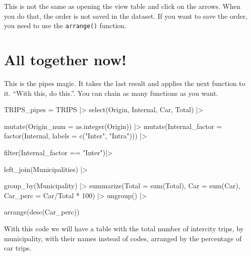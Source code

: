 \documentclass[
  letterpaper,
  DIV=11,
  numbers=noendperiod]{scrreprt}
\newenvironment{Shaded}{\begin{snugshade}}{\end{snugshade}}
\newcommand{\AttributeTok}[1]{\textcolor[rgb]{0.40,0.45,0.13}{#1}}
\newcommand{\DecValTok}[1]{\textcolor[rgb]{0.68,0.00,0.00}{#1}}
\newcommand{\FunctionTok}[1]{\textcolor[rgb]{0.28,0.35,0.67}{#1}}
\newcommand{\NormalTok}[1]{\textcolor[rgb]{0.00,0.23,0.31}{#1}}
\newcommand{\OtherTok}[1]{\textcolor[rgb]{0.00,0.23,0.31}{#1}}
\newcommand{\SpecialCharTok}[1]{\textcolor[rgb]{0.37,0.37,0.37}{#1}}
\newcommand{\StringTok}[1]{\textcolor[rgb]{0.13,0.47,0.30}{#1}}
\begin{document}
This is not the same as opening the view table and click on the arrows.
When you do that, the order is not saved in the dataset. If you want to
save the order, you need to use the \texttt{arrange()} function.

\section{All together now!}\label{all-together-now}

This is the pipes magic. It takes the last result and applies the next
function to it. ``With this, do this.''. You can chain as many functions
as you want.

\begin{Shaded}
\begin{Highlighting}[]
\NormalTok{TRIPS\_pipes }\OtherTok{=}\NormalTok{ TRIPS }\SpecialCharTok{|\textgreater{}} 
  \FunctionTok{select}\NormalTok{(Origin, Internal, Car, Total) }\SpecialCharTok{|\textgreater{}} 
  
  \FunctionTok{mutate}\NormalTok{(}\AttributeTok{Origin\_num =} \FunctionTok{as.integer}\NormalTok{(Origin)) }\SpecialCharTok{|\textgreater{}} 
  \FunctionTok{mutate}\NormalTok{(}\AttributeTok{Internal\_factor =} \FunctionTok{factor}\NormalTok{(Internal, }\AttributeTok{labels =} \FunctionTok{c}\NormalTok{(}\StringTok{"Inter"}\NormalTok{, }\StringTok{"Intra"}\NormalTok{))) }\SpecialCharTok{|\textgreater{}} 
  
  \FunctionTok{filter}\NormalTok{(Internal\_factor }\SpecialCharTok{==} \StringTok{"Inter"}\NormalTok{)}\SpecialCharTok{|\textgreater{}}
  
  \FunctionTok{left\_join}\NormalTok{(Municipalities) }\SpecialCharTok{|\textgreater{}}
  
  \FunctionTok{group\_by}\NormalTok{(Municipality) }\SpecialCharTok{|\textgreater{}}
  \FunctionTok{summarize}\NormalTok{(}\AttributeTok{Total =} \FunctionTok{sum}\NormalTok{(Total),}
            \AttributeTok{Car =} \FunctionTok{sum}\NormalTok{(Car),}
            \AttributeTok{Car\_perc =}\NormalTok{ Car}\SpecialCharTok{/}\NormalTok{Total }\SpecialCharTok{*} \DecValTok{100}\NormalTok{) }\SpecialCharTok{|\textgreater{}} 
  \FunctionTok{ungroup}\NormalTok{() }\SpecialCharTok{|\textgreater{}} 
  
  \FunctionTok{arrange}\NormalTok{(}\FunctionTok{desc}\NormalTok{(Car\_perc))}
\end{Highlighting}
\end{Shaded}

With this code we will have a table with the total number of intercity
trips, by municipality, with their names instead of codes, arranged by
the percentage of car trips.
\end{document}
